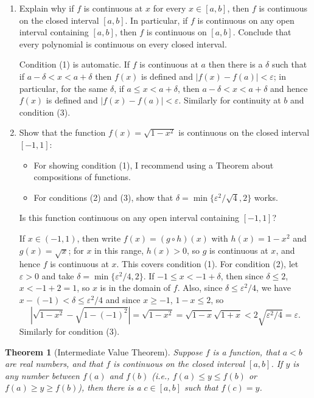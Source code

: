 \documentclass[12pt]{amsart}
\def\d{\delta}
\def\e{\varepsilon}
\numberwithin{equation}{section}
\theoremstyle{plain} %
\newtheorem{thm}[equation]{Theorem}
\theoremstyle{definition}
\theoremstyle{remark}
\begin{document}
\begin{enumerate}
\item Explain why if $f$ is continuous at $x$ for every $x\in[a,b]$, then $f$ is continuous on the closed interval $[a,b]$. In particular, if $f$ is continuous on any open interval containing $[a,b]$, then $f$ is continuous on $[a,b]$. Conclude that every polynomial is continuous on every closed interval.

\begin{framed}
Condition (1) is automatic. If $f$ is continuous at $a$ then there is a $\d$ such that if $a-\d < x < a+\d$ then $f(x)$ is defined and ${|f(x)
  - f(a)| < \e}$; in particular, for the same $\d$, if $a \leq x < a+\d$, then  $a-\d < x < a+\d$ and hence $f(x)$ is defined and ${|f(x)
  - f(a)| < \e}$. Similarly for continuity at $b$ and condition (3).
\end{framed}

\item Show that the function $f(x) = \sqrt{1-x^2}$ is continuous on the closed interval $[-1,1]$:
\begin{itemize}
\item For showing condition (1), I recommend using a Theorem about compositions of functions.
\item For conditions (2) and (3), show that $\delta = \min\{\e^2 /\sqrt{4} , 2\}$ works.
\end{itemize}
Is this function continuous on any open interval containing $[-1,1]$?

\begin{framed}
If $x\in (-1,1)$, then write $f(x) = (g\circ h)(x)$ with $h(x)=1-x^2$ and $g(x)=\sqrt{x}$; for $x$ in this range, $h(x) >0$, so $g$ is continuous at $x$, and hence $f$ is continuous at $x$. This covers condition (1). For condition (2), let $\e>0$ and take $\delta = \min\{\e^2 /4 , 2\}$. If $-1\leq x < -1 + \d$, then since $\d\leq 2$, $x< -1+2 = 1$, so $x$ is in the domain of $f$. Also, since $\d \leq \e^2 /4$, we have $x-(-1) < \d \leq \e^2 /4$ and since $x\geq -1$, $1-x \leq 2$, so \[ |\sqrt{1-x^2} - \sqrt{1-(-1)^2}| = \sqrt{1-x^2} =   \sqrt{1-x} \sqrt{1+x} < 2 \sqrt{ \e^2 /4} = \e.\] Similarly for condition (3).
\end{framed}
\end{enumerate}


\begin{thm}[Intermediate Value Theorem] Suppose $f$ is a function, that $a < b$ are real numbers, and that $f$ is continuous on the closed interval
  $[a,b]$. If $y$ is any number between $f(a)$ and $f(b)$ (i.e., $f(a) \leq y \leq f(b)$ or
$f(a) \geq y \geq f(b)$), then there is a $c \in [a,b]$ such that $f(c) = y$.\end{thm}
\end{document}
